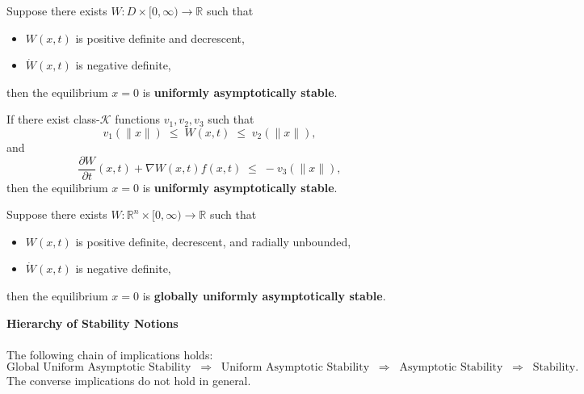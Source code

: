 \begin{theorem}
Suppose there exists $W:D\times[0,\infty)\to\mathbb{R}$ such that
\begin{itemize}
    \item $W(x,t)$ is positive definite and decrescent,  
    \item $\dot{W}(x,t)$ is negative definite,  
\end{itemize}
then the equilibrium $x=0$ is \textbf{uniformly asymptotically stable}.
\end{theorem}

\begin{theorem}
If there exist class-$\mathcal{K}$ functions $v_1, v_2, v_3$ such that
\begin{equation}
v_1(\|x\|) \;\le\; W(x,t) \;\le\; v_2(\|x\|), 
\end{equation}
and
\begin{equation}
\frac{\partial W}{\partial t}(x,t) + \nabla W(x,t) f(x,t) \;\le\; -v_3(\|x\|),
\end{equation}
then the equilibrium $x=0$ is \textbf{uniformly asymptotically stable}.
\end{theorem}

\begin{theorem}
Suppose there exists $W:\mathbb{R}^n\times[0,\infty)\to\mathbb{R}$ such that
\begin{itemize}
    \item $W(x,t)$ is positive definite, decrescent, and radially unbounded,  
    \item $\dot{W}(x,t)$ is negative definite,  
\end{itemize}
then the equilibrium $x=0$ is \textbf{globally uniformly asymptotically stable}.
\end{theorem}

\begin{remark}\textbf{Hierarchy of Stability Notions}
\\\\The following chain of implications holds:
\begin{equation}
\text{Global Uniform Asymptotic Stability} 
\;\;\Rightarrow\;\; \text{Uniform Asymptotic Stability} 
\;\;\Rightarrow\;\; \text{Asymptotic Stability} 
\;\;\Rightarrow\;\; \text{Stability}.
\end{equation}
The converse implications do not hold in general.
\end{remark}

